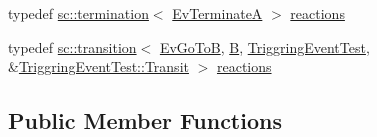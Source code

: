 \begin{DoxyCompactItemize}
\item 
typedef \mbox{\hyperlink{classboost_1_1statechart_1_1termination}{sc\+::termination}}$<$ \mbox{\hyperlink{struct_ev_terminate_a}{Ev\+TerminateA}} $>$ \mbox{\hyperlink{struct_a_a9fdfa49e1cf1fe54c74cab8e5e690f55}{reactions}}
\item 
typedef \mbox{\hyperlink{classboost_1_1statechart_1_1transition}{sc\+::transition}}$<$ \mbox{\hyperlink{struct_ev_go_to_b}{Ev\+Go\+ToB}}, \mbox{\hyperlink{struct_b}{B}}, \mbox{\hyperlink{struct_triggring_event_test}{Triggring\+Event\+Test}}, \&\mbox{\hyperlink{struct_triggring_event_test_aa24d7f5136f07fac2ed5678f205c9a89}{Triggring\+Event\+Test\+::\+Transit}} $>$ \mbox{\hyperlink{struct_a_a05e1d654ca7a79baae73615a421909d1}{reactions}}
\end{DoxyCompactItemize}
\subsection*{Public Member Functions}
